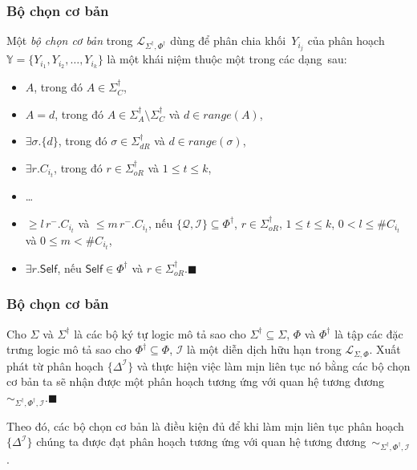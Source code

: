 \documentclass[fleqn]{beamer}
\newcommand{\mL}		{\mathcal{L}}
\newcommand{\mI}		{\mathcal{I}}
\newcommand{\mQ}		{\mathcal{Q}}
\newcommand{\mbY}		{\mathbb{Y}}
\newcommand{\SigmaDag}	{\Sigma^\dag}
\newcommand{\SigmaDagA}	{\Sigma^\dag_A}
\newcommand{\SigmaDagC}	{\Sigma^\dag_C}
\newcommand{\SigmaDagOR}{\Sigma^\dag_{oR}}
\newcommand{\SigmaDagDR}{\Sigma^\dag_{dR}}
\newcommand{\PhiDag}	{\Phi^\dag}
\newcommand{\Self}		{\mathsf{Self}}
\newcommand{\mLSP}		{\mL_{\Sigma,\Phi}}
\newcommand{\mLSPD}		{\mL_{\Sigma^\dag,\Phi^\dag}}
\newcommand{\SdPdI}		{{\SigmaDag,\Phi^\dag,\mI}}
\newcommand{\myend}		{\mbox{}\hfill\mbox{{\tiny$\!\blacksquare$}}}
\newcommand{\E}			{\exists}
\newcommand{\Range}		{\mathit{range}}
\begin{document}
\begin{frame}\frametitle{\bf Bộ chọn cơ bản}
\begin{Definition}
	\label{def:BasicSelectors}
	Một {\em bộ chọn cơ bản} trong $\mLSPD$ dùng để phân chia khối~$Y_{i_j}$ của phân hoạch $\mbY = \{Y_{i_1}, Y_{i_2}, \ldots, Y_{i_k}\}$ là một khái niệm thuộc một trong các dạng~sau:
	\begin{itemize}
		\item $A$, trong đó $A \in \SigmaDagC$,
		\item $A=d$, trong đó $A \in \SigmaDagA\setminus\SigmaDagC$ và $d \in \Range(A)$,
		\item $\E \sigma.\{d\}$, trong đó $\sigma \in \SigmaDagDR$ và $d \in \Range(\sigma)$,
		\item $\E r.C_{i_t}$, trong đó $r \in \SigmaDagOR$ và $1 \leq t \leq k$,
		\item \ldots
		\item $\geq\!l\,r^-.C_{i_t}$ và $\leq\!m\,r^-.C_{i_t}$, nếu $\{\mQ, \mI\} \subseteq \Phi^\dag$, $r \in \SigmaDagOR$, $1 \leq t \leq k$, $0 < l \leq \#C_{i_t}$ và $0 \leq m < \#C_{i_t}$,
		\item $\E r.\Self$, nếu $\Self \in \Phi^\dag$ và $r \in \SigmaDagOR$.\myend
	\end{itemize}
\end{Definition}	
\end{frame}

\begin{frame}\frametitle{\bf Bộ chọn cơ bản}
\begin{Theorem}
	\label{th:BasicSelectors}
	Cho $\Sigma$ và $\SigmaDag$ là các bộ ký tự logic mô tả sao cho $\SigmaDag \subseteq \Sigma$, $\Phi$ và $\PhiDag$ là tập các đặc trưng logic mô tả sao cho $\PhiDag \subseteq \Phi$, $\mI$ là một diễn dịch hữu hạn trong $\mLSP$.
	Xuất phát từ phân hoạch $\{\Delta^\mI\}$ và thực hiện việc làm mịn liên tục nó bằng các bộ chọn cơ bản ta sẽ nhận được một phân hoạch tương ứng với quan hệ tương đương~$\sim_\SdPdI$.\myend
\end{Theorem}

\vspace{2.0ex}
Theo đó, các bộ chọn cơ bản là điều kiện đủ để khi làm mịn liên tục phân hoạch $\{\Delta^\mI\}$ chúng ta được đạt phân hoạch tương ứng với quan hệ tương đương~$\sim_\SdPdI$.

\end{frame}
\end{document}
